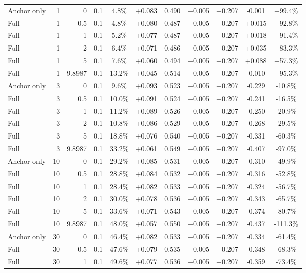 \begin{table}[htbp]
\begin{tabular}{lrrrccccccc}
Anchor only & 1 & 0 & 0.1 & 4.8\% & +0.083 & 0.490 & +0.005 & +0.207 & -0.001 & +99.4\% \\
Full & 1 & 0.5 & 0.1 & 4.8\% & +0.080 & 0.487 & +0.005 & +0.207 & +0.015 & +92.8\% \\
Full & 1 & 1 & 0.1 & 5.2\% & +0.077 & 0.487 & +0.005 & +0.207 & +0.018 & +91.4\% \\
Full & 1 & 2 & 0.1 & 6.4\% & +0.071 & 0.486 & +0.005 & +0.207 & +0.035 & +83.3\% \\
Full & 1 & 5 & 0.1 & 7.6\% & +0.060 & 0.494 & +0.005 & +0.207 & +0.088 & +57.3\% \\
Full & 1 & 9.8987 & 0.1 & 13.2\% & +0.045 & 0.514 & +0.005 & +0.207 & -0.010 & +95.3\% \\
Anchor only & 3 & 0 & 0.1 & 9.6\% & +0.093 & 0.523 & +0.005 & +0.207 & -0.229 & -10.8\% \\
Full & 3 & 0.5 & 0.1 & 10.0\% & +0.091 & 0.524 & +0.005 & +0.207 & -0.241 & -16.5\% \\
Full & 3 & 1 & 0.1 & 11.2\% & +0.089 & 0.526 & +0.005 & +0.207 & -0.250 & -20.9\% \\
Full & 3 & 2 & 0.1 & 10.8\% & +0.086 & 0.529 & +0.005 & +0.207 & -0.268 & -29.5\% \\
Full & 3 & 5 & 0.1 & 18.8\% & +0.076 & 0.540 & +0.005 & +0.207 & -0.331 & -60.3\% \\
Full & 3 & 9.8987 & 0.1 & 33.2\% & +0.061 & 0.549 & +0.005 & +0.207 & -0.407 & -97.0\% \\
Anchor only & 10 & 0 & 0.1 & 29.2\% & +0.085 & 0.531 & +0.005 & +0.207 & -0.310 & -49.9\% \\
Full & 10 & 0.5 & 0.1 & 28.8\% & +0.084 & 0.532 & +0.005 & +0.207 & -0.316 & -52.8\% \\
Full & 10 & 1 & 0.1 & 28.4\% & +0.082 & 0.533 & +0.005 & +0.207 & -0.324 & -56.7\% \\
Full & 10 & 2 & 0.1 & 30.0\% & +0.078 & 0.536 & +0.005 & +0.207 & -0.343 & -65.7\% \\
Full & 10 & 5 & 0.1 & 33.6\% & +0.071 & 0.543 & +0.005 & +0.207 & -0.374 & -80.7\% \\
Full & 10 & 9.8987 & 0.1 & 48.0\% & +0.057 & 0.550 & +0.005 & +0.207 & -0.437 & -111.3\% \\
Anchor only & 30 & 0 & 0.1 & 46.4\% & +0.082 & 0.533 & +0.005 & +0.207 & -0.334 & -61.4\% \\
Full & 30 & 0.5 & 0.1 & 47.6\% & +0.079 & 0.535 & +0.005 & +0.207 & -0.348 & -68.3\% \\
Full & 30 & 1 & 0.1 & 49.6\% & +0.077 & 0.536 & +0.005 & +0.207 & -0.359 & -73.4\% \\

\end{tabular}
\end{table}
